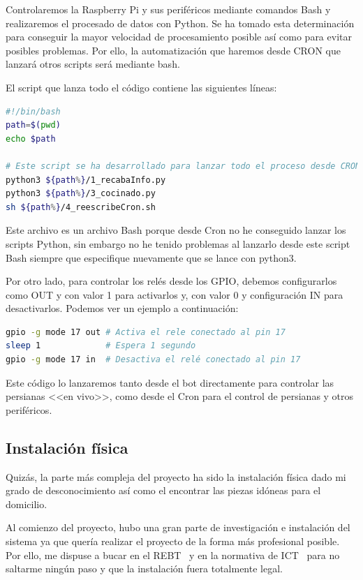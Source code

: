 Controlaremos la Raspberry Pi y sus periféricos mediante comandos Bash y realizaremos el procesado de datos con Python. Se ha tomado esta determinación para conseguir la mayor velocidad de procesamiento posible así como para evitar posibles problemas. Por ello, la automatización que haremos desde CRON que lanzará otros scripts será mediante bash. 

El script que lanza todo el código contiene las siguientes líneas:

\begin{lstlisting}[language=sh, caption={Script que lanza el proceso automático completo.}]
#!/bin/bash
path=$(pwd)
echo $path

# Este script se ha desarrollado para lanzar todo el proceso desde CRON.
python3 ${path%}/1_recabaInfo.py
python3 ${path%}/3_cocinado.py
sh ${path%}/4_reescribeCron.sh
\end{lstlisting}

Este archivo es un archivo Bash porque desde Cron no he conseguido lanzar los scripts Python, sin embargo no he tenido problemas al lanzarlo desde este script Bash siempre que especifique nuevamente que se lance con python3.

Por otro lado, para controlar los relés desde los GPIO, debemos configurarlos como OUT y con valor 1 para activarlos y, con valor 0 y configuración IN para desactivarlos. Podemos ver un ejemplo a continuación:
\begin{lstlisting}[language=sh, caption={Ejemplo activación y desactivación de relé.}]
gpio -g mode 17 out # Activa el rele conectado al pin 17
sleep 1             # Espera 1 segundo
gpio -g mode 17 in  # Desactiva el relé conectado al pin 17
\end{lstlisting}

Este código lo lanzaremos tanto desde el bot directamente para controlar las persianas <<en vivo>>, como desde el Cron para el control de persianas y otros periféricos.

\subsection{Instalación física}
Quizás, la parte más compleja del proyecto ha sido la instalación física dado mi grado de desconocimiento así como el encontrar las piezas idóneas para el domicilio.

Al comienzo del proyecto, hubo una gran parte de investigación e instalación del sistema ya que quería realizar el proyecto de la forma más profesional posible. Por ello, me dispuse a bucar en el REBT~\cite{manual:REBT} y en la normativa de ICT~\cite{manual:ICT-BT-21} para no saltarme ningún paso y que la instalación fuera totalmente legal.

